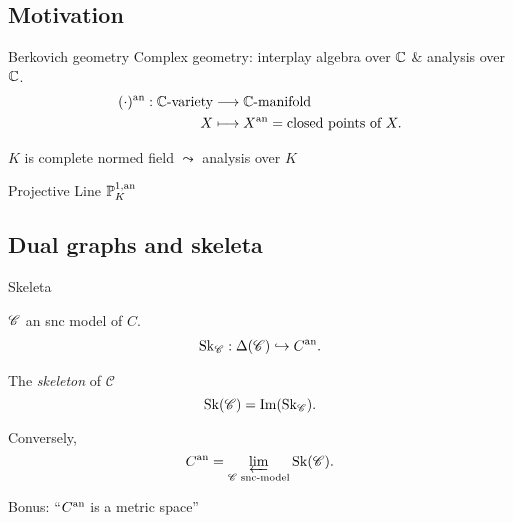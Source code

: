 
\subsection{Motivation}\label{sec:motivation}
\begin{frame}{Berkovich geometry}
	Complex geometry: interplay algebra over $\mathbb C$ \& analysis over $\mathbb C$. 
	\begin{align*}
		(\cdot ){}^{\text{an}} : \mathbb C\text{-variety} &\longrightarrow \mathbb C\text{-manifold} \\
		X &\longmapsto X{}^{\text{an}} = \text{closed points of }X 
	.\end{align*}
	\pause

	$K$ is complete normed field $\leadsto$ analysis over $K$ 
\end{frame}

\begin{frame}{Projective Line $\mathbb P^{1, \text{an}}_{K}$}
\end{frame}

\subsection{Dual graphs and skeleta} \label{sec:dual_graphs_and_skeleta}
\begin{frame}{Skeleta}
	\begin{minipage}{.49\textwidth}
	 $\mathscr C$ an snc model of  $C$. 
	 \begin{align*}
		 \operatorname{Sk}_{\mathscr C}: \Delta(\mathscr C) \hookrightarrow C{}^{\text{an}}
	 .\end{align*}
	\end{minipage}\;\;
	\begin{minipage}{.48\textwidth}
	 \begin{definition}
		 The \emph{skeleton} of $\mathscr C$
	 	\[
			\operatorname{Sk}(\mathscr C) = \operatorname{Im} (\operatorname{Sk}_{\mathscr C})
	 	.\] 
	 \end{definition}
	\end{minipage}

	\bigskip
	\pause

	 Conversely, \[
		 C{}^{\text{an}} = \varprojlim_{\mathscr C \text{ snc-model}} \operatorname{Sk}(\mathscr C)
	 .\] 

	 \medskip 
	 Bonus: ``$C{}^{\text{an}}$ is a metric space''
\end{frame}


